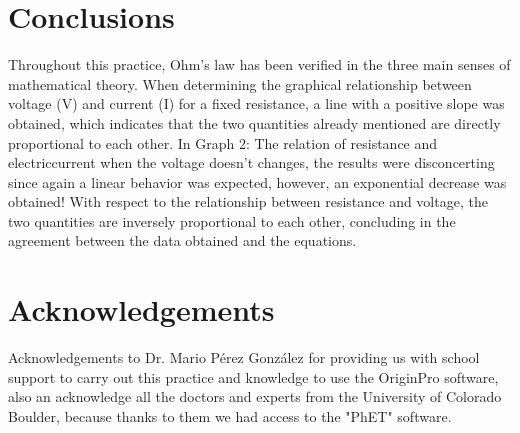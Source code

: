\documentclass[a4paper,10pt]{article}
\begin{document}
\begin{multicols}{2}
\section{\textcolor{MiColor1}{\textbf{Conclusions}}}
Throughout this practice, Ohm's law has been verified in the three main senses of mathematical theory. When determining the graphical relationship between voltage (V) and current (I) for a fixed resistance, a line with a positive slope was obtained, which indicates that the two quantities already mentioned are directly proportional to each other. In Graph 2: The relation of resistance and electriccurrent when the voltage doesn’t changes, the results were disconcerting since again a linear behavior was expected, however, an exponential decrease was obtained! With respect to the relationship between resistance and voltage, the two quantities are inversely proportional to each other, concluding in the agreement between the data obtained and the equations.
\section{\textcolor{MiColor1}{\textbf{Acknowledgements}}}
Acknowledgements to Dr. Mario Pérez González for providing us with school support to carry out this practice and knowledge to use the OriginPro software, also an acknowledge all the doctors and experts from the University of Colorado Boulder, because thanks to them we had access to the "PhET" software.

\begin{thebibliography}{}


\end{thebibliography}
\end{multicols}
\end{document}
